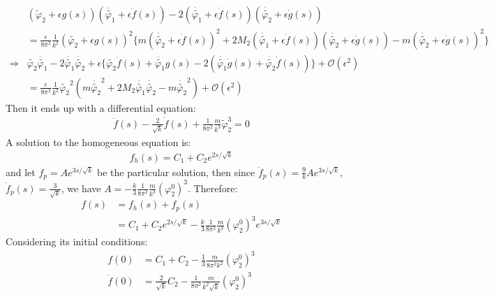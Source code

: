 \begin{align}
    &(\tilde \varphi_{2} + \epsilon g(s))(\ddot {\tilde {\varphi_{1}}} + \epsilon \ddot f(s)) - 2 (\dot {\tilde{\varphi_{1}}} + \epsilon \dot {f}(s))(\dot {\tilde{\varphi_{2}}} +\epsilon \dot{g}(s)) \nonumber \\
    &= \frac{\epsilon}{8\pi^{2}}\frac{1}{k^2} (\tilde{\varphi_{2}} + \epsilon g(s))^{2}\lbrace m(\dot{\tilde{\varphi_{2}}} + \epsilon \dot{f}(s))^{2} +2M_{2} (\dot{\tilde{\varphi_{1}}} + \epsilon \dot{f}(s))(\dot{\tilde{\varphi_{2}}} + \epsilon \dot{g}(s)) - m (\dot{\tilde{\varphi_{2}}} + \epsilon \dot{g}(s))^{2} \rbrace \nonumber \\
    \Rightarrow &\tilde{\varphi_{2}}\ddot{\tilde{\varphi_{1}}}-2\dot{\tilde{\varphi_{1}}}\dot{\tilde{\varphi_{2}}} + \epsilon\lbrace \tilde{\varphi_{2}}\ddot{f}(s) + \ddot{\tilde{\varphi_{1}}}g(s) - 2(\dot{\tilde{\varphi_{1}}}\dot{g}(s) + \dot{\tilde{\varphi_{2}}}\dot{f}(s)) \rbrace  + \mathcal{O}(\epsilon ^{2}) \nonumber \\
    &= \frac{\epsilon}{8\pi^{2}}\frac{1}{k^{2}} \tilde{\varphi _{2}} ^{2} (m\dot{\tilde{\varphi_{2}}} ^{2} + 2M_{2} \dot{\tilde{\varphi_{1}}}\dot{\tilde{\varphi_{2}}} -m \dot{\tilde{\varphi_{2}}}^{2}) + \mathcal{O}(\epsilon^{2}) \nonumber
\end{align}
Then it ends up with a differential equation:
\begin{align}
    \label{eq:2.84}
    \ddot{f} (s) - \frac{2}{\sqrt{k}} \dot {f} (s)+ \frac{1}{8\pi^{2}} \frac{m}{k^{3}}\tilde \varphi_{2} ^{3} = 0 
\end{align}
A solution to the homogeneous equation is:
\begin{align}
    f_{h} (s) = C_{1} + C_{2} e^{2s/\sqrt{k}} 
\end{align}
and let $f_{p} = A e^{3s/ \sqrt{k}}$ be the particular solution, then since $\ddot f_{p} (s) = \frac{9}{k} Ae^{3s/\sqrt{k}}$, $\dot f_{p} (s) = \frac{3}{\sqrt{k}}$, we have $A = -\frac{k}{3} \frac{1}{8\pi^{2}}\frac{m}{k^{3}} (\varphi_{2}^{0})^{3}$. Therefore:
\begin{align}
    f(s) &= f_{h}(s) + f_{p}(s) \nonumber \\
    &= C_{1} + C_{2} e^{2s/\sqrt{k}} - \frac{k}{3}\frac{1}{8\pi^{2}}\frac{m}{k^{3}}(\varphi_{2}^{0})^{3} e^{3s/\sqrt{k}}
\end{align}
Considering its initial conditions:
\begin{align}
    f(0) &= C_{1} + C_{2} - \frac{1}{3}\frac{m}{8\pi^{2}k^{2}}(\varphi_{2}^{0})^{3} \\
    \dot{f}(0) &= \frac{2}{\sqrt{k}}C_{2} -  \frac{1}{8\pi^{2}}\frac{m}{k^{2}\sqrt{k}}(\varphi_{2}^{0})^{3}
\end{align}
